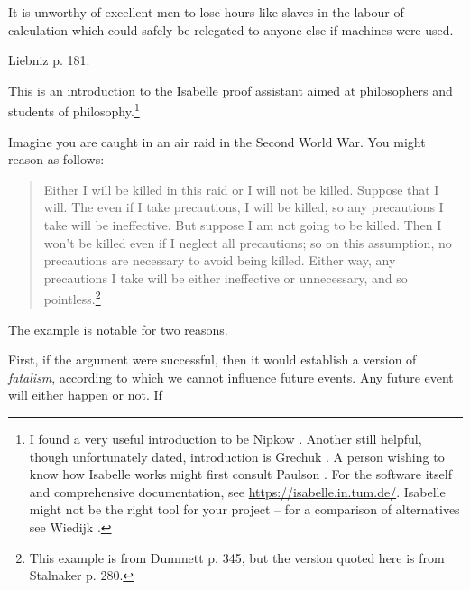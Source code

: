 %
\begin{isabellebody}%
%
%
\isadelimtheory
%
\endisadelimtheory
%
\isatagtheory
%
\endisatagtheory
{\isafoldtheory}%
%
\isadelimtheory
%
\endisadelimtheory
%
\begin{isamarkuptext}%
\epigraph{It is unworthy of excellent men to lose hours like slaves in the labour of calculation which could 
safely be relegated to anyone else if machines were used.}{Liebniz \cite{smith_source_1959} p. 181.}%
\end{isamarkuptext}\isamarkuptrue%
%
\begin{isamarkuptext}%
This is an introduction to the Isabelle proof assistant aimed at philosophers and students
of philosophy.\footnote{I found a very useful introduction to be Nipkow \cite{nipkow_tutorial_2011}.
Another still helpful, though unfortunately dated, introduction is Grechuk \cite{grechuk_isabelle_2010}.
A person wishing to know how Isabelle works might first consult Paulson \cite{paulson_ml_1996}.
For the software itself and comprehensive documentation, see \url{https://isabelle.in.tum.de/}.
Isabelle might not be the right tool for your project -- for a comparison of alternatives see
Wiedijk \cite{wiedijk_seventeen_2006}.}%
\end{isamarkuptext}\isamarkuptrue%
%
\isamarkuptrue%
%
\begin{isamarkuptext}%
Imagine you are caught in an air raid in the Second World War. You might reason as follows:
\begin{quotation}
Either I will be killed in this raid or I will not be killed. Suppose that I will. The even if I take
precautions, I will be killed, so any precautions I take will be ineffective. But suppose I am not
going to be killed. Then I won't be killed even if I neglect all precautions; so on this assumption,
no precautions are necessary to avoid being killed. Either way, any precautions I take will be either
ineffective or unnecessary, and so pointless.\footnote{This example is from Dummett \cite{dummett_bringing_1964} p. 345,
but the version quoted here is from Stalnaker \cite{stalnaker_indicative_1975} p. 280.}
\end{quotation} The example is notable for two reasons.%
\end{isamarkuptext}\isamarkuptrue%
%
\begin{isamarkuptext}%
First, if the argument were successful, then it would establish a version of \emph{fatalism},
according to which we cannot influence future events. Any future event will either happen or not. If

\end{isamarkuptext}
\end{isabellebody}
